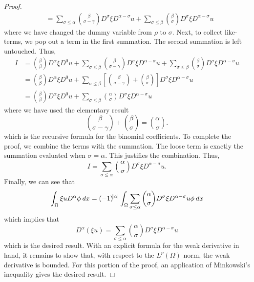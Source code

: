 \documentclass[10pt]{article}
\begin{document}
\begin{proof}
\begin{align*}
		&= \sum\limits_{\sigma \leq \alpha}{\binom{\beta}{\sigma - \gamma}D^{\sigma}\xi D^{\alpha - \sigma}u} + \sum\limits_{\sigma \leq \beta}{\binom{\beta}{\sigma}D^\sigma \xi D^{\alpha - \sigma}u}
	\end{align*}
	where we have changed the dummy variable from $\rho$ to $\sigma$. Next, to collect like-terms, we pop out a term in the first summation. The second summation is left untouched. Thus, 
	\begin{align*}
		\displaystyle I &= \binom{\beta}{\beta}D^\alpha\xi D^{0}u + \sum\limits_{\sigma \leq \beta}{\binom{\beta}{\sigma - \gamma}D^\sigma\xi D^{\alpha - \sigma}u} + \sum\limits_{\sigma \leq \beta}{\binom{\beta}{\sigma}D^\sigma \xi D^{\alpha - \sigma}u} \\
		&= \binom{\beta}{\beta}D^\alpha\xi D^{0}u + \sum\limits_{\sigma \leq \beta}{\left[\binom{\beta}{\sigma - \gamma}+\binom{\beta}{\sigma}\right]D^\sigma \xi D^{\alpha - \sigma}u} \\
		&= \binom{\beta}{\beta}D^\alpha\xi D^{0}u + \sum\limits_{\sigma \leq \beta}{\binom{\alpha}{\sigma}D^\sigma \xi D^{\alpha - \sigma}u} 
	\end{align*}
	where we have used the elementary result 
	\begin{equation*}
		\displaystyle \binom{\beta}{\sigma - \gamma} + \binom{\beta}{\sigma} = \binom{\alpha}{\sigma}.
	\end{equation*}
	which is the recursive formula for the binomial coefficients. To complete the proof, we combine the terms with the summation. The loose term is exactly the summation evaluated when $\sigma = \alpha$. This justifies the combination. Thus,
	\begin{equation*}
		\displaystyle I = \sum\limits_{\sigma \leq \alpha}{\binom{\alpha}{\sigma}D^\sigma \xi D^{\alpha - \sigma}u}.
	\end{equation*}
	Finally, we can see that 
	\begin{equation*}
		\displaystyle \int_{\Omega}{\xi u D^\alpha \phi \: dx} = (-1)^{\abs{\alpha}}\int_{\Omega}{\sum\limits_{\sigma \leq \alpha}{\binom{\alpha}{\sigma}D^\sigma \xi D^{\alpha - \sigma}u} \phi \: dx}
	\end{equation*}
	which implies that 
	\begin{equation*}
		\displaystyle D^\alpha(\xi u) = \sum\limits_{\sigma \leq \alpha}{\binom{\alpha}{\sigma}D^\sigma \xi D^{\alpha - \sigma}u}
	\end{equation*}
	which is the desired result. With an explicit formula for the weak derivative in hand, it remains to show that, with respect to the $L^p(\Omega)$ norm, the weak derivative is bounded. For this portion of the proof, an application of Minkowski's inequality gives the desired result. 
\end{proof}
\end{document}
